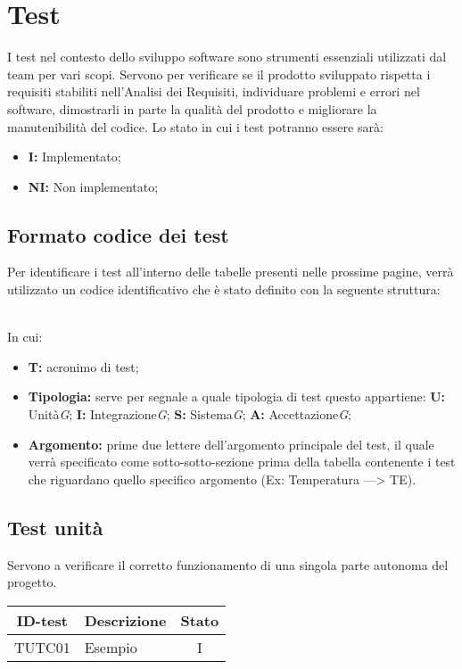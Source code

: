 \section{Test}
I test nel contesto dello sviluppo software sono strumenti essenziali utilizzati dal team per vari scopi. Servono per verificare se il prodotto sviluppato rispetta i requisiti stabiliti nell'Analisi dei Requisiti, individuare problemi e errori nel software, dimostrarli in parte la qualità del prodotto e migliorare la manutenibilità del codice.
Lo stato in cui i test potranno essere sarà:
\begin{itemize}
    \item \textbf{I:} Implementato;
    \item \textbf{NI:} Non implementato;
\end{itemize}

\subsection{Formato codice dei test}
Per identificare i test all’interno delle tabelle presenti nelle prossime pagine, verrà utilizzato un codice identificativo che è stato definito con la seguente struttura:

 \\

In cui:
\begin{itemize}
    \item \textbf{T:} acronimo di test;
    \item \textbf{Tipologia:} serve per segnale a quale tipologia di test questo appartiene:
        \subitem \textbf{U:} Unità\textit{G};
        \subitem \textbf{I:} Integrazione\textit{G};
        \subitem \textbf{S:} Sistema\textit{G};
        \subitem \textbf{A:} Accettazione\textit{G};
    \item \textbf{Argomento:} prime due lettere dell’argomento principale del test, il quale verrà specificato come sotto-sotto-sezione prima della tabella contenente i test che riguardano quello specifico argomento (Ex: Temperatura —> TE). 
\end{itemize}

\subsection{Test unità}
Servono a verificare il corretto funzionamento di una singola parte autonoma del progetto.
\begin{tabular}{|c|p{4cm}|c|}
    \hline
    \textbf{ID-test} & \textbf{Descrizione} & \textbf{Stato} \\
    \hline
    TUTC01 & Esempio & I \\
    \hline
\end{tabular}

